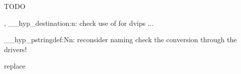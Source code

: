 TODO

\hyper@anchor, \__hyp_destination:n:
check use of \@pdfviewparams for dvips ...


\__hyp_pstringdef:Nn: reconsider naming
check the conversion through the drivers!

replace \hyper@chars